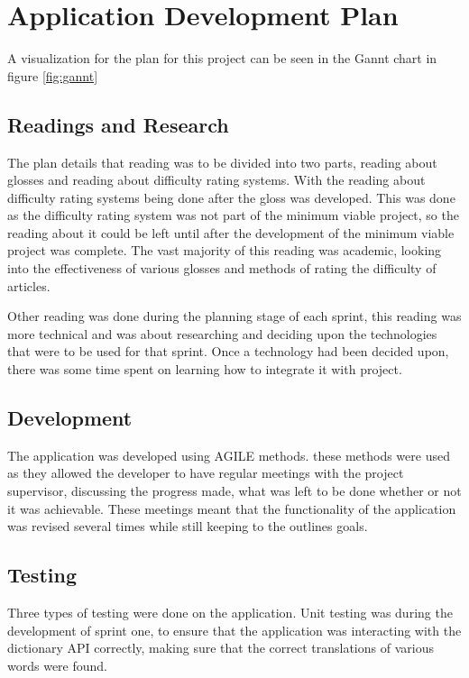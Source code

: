 \chapter{Application Development Plan}

A visualization for the plan for this project can be seen in the Gannt chart in figure \ref{fig:gannt}
 

\section{Readings and Research}

The plan details that reading was to be divided into two parts, reading about glosses and reading about difficulty rating systems. With the reading about difficulty rating systems being done after the gloss was developed. This was done as the difficulty rating system was not part of the minimum viable project, so the reading about it could be left until after the development of the minimum viable project was complete. The vast majority of this reading was academic, looking into the effectiveness of various glosses and methods of rating the difficulty of articles.

Other reading was done during the planning stage of each sprint, this reading was more technical and was about researching and deciding upon the technologies that were to be used for that sprint. Once a technology had been decided upon, there was some time spent on learning how to integrate it with project.


\section{Development}

The application was developed using AGILE methods. these methods were used as they allowed the developer to have regular meetings with the project supervisor, discussing the progress made, what was left to be done whether or not it was achievable. These meetings meant that the functionality of the application was revised several times while still keeping to the outlines goals. 

\section{Testing}

Three types of testing were done on the application. Unit testing was during the development of sprint one, to ensure that the application was interacting with the dictionary API correctly, making sure that the correct translations of various words were found. 

